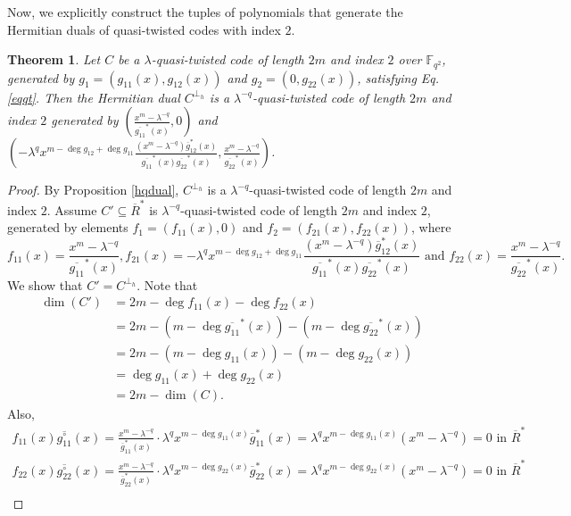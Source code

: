 \documentclass[12 pt]{extarticle}
\numberwithin{equation}{section}
\newtheorem{theorem}{Theorem}[section]
\theoremstyle{definition}
\begin{document}
Now, we explicitly construct the tuples of polynomials that generate the Hermitian duals of quasi-twisted codes with index $2$.
\begin{theorem}\label{thmhdual}
    Let $C$ be a $\lambda$-quasi-twisted code of length $2m$ and index $2$ over $\mathbb{F}_{q^2}$, generated by $g_1=(g_{11}(x),g_{12}(x))$ and $g_2=(0,g_{22}(x))$, satisfying Eq. \ref{eqqt}. Then the Hermitian dual $C^{\perp_h}$ is a $\lambda^{-q}$-quasi-twisted code of length $2m$ and index $2$ generated by $\left (\frac{x^m-\lambda^{-q}}{\overline{g_{11}}^*(x)},0\right )$ and $\left (-\lambda^q x^{m-\deg g_{12}+\deg g_{11}}\frac{(x^m-\lambda^{-q})\overline{g}^*_{12}(x)}{\overline{g_{11}}^*(x)\overline{g_{22}}^*(x)},\frac{x^m-\lambda^{-q}}{\overline{g_{22}}^*(x)}\right )$.
\end{theorem}
\begin{proof}
  By Proposition \ref{hqdual}, $C^{\perp_h}$ is a $\lambda^{-q}$-quasi-twisted code of length $2m$ and index $2$. Assume $C'\subseteq \overline{R}^*$ is $\lambda^{-q}$-quasi-twisted code of length $2m$ and index $2$, generated by elements $f_1=(f_{11}(x),0)$ and $f_2=(f_{21}(x),f_{22}(x))$, where
  $$f_{11}(x)=\frac{x^m-\lambda^{-q}}{\overline{g_{11}}^*(x)}, f_{21}(x)=-\lambda^q x^{m-\deg g_{12}+\deg g_{11}}\frac{(x^m-\lambda^{-q})\overline{g}^*_{12}(x)}{\overline{g_{11}}^*(x)\overline{g_{22}}^*(x)} \text{ and } f_{22}(x)=\frac{x^m-\lambda^{-q}}{\overline{g_{22}}^*(x)}.$$
We show that $C'=C^{\perp_h}$.  Note that
 \begin{equation*}
 \begin{split}
      \dim (C')&=2m-\deg f_{11}(x)-\deg f_{22}(x)\\
      &=2m-(m-\deg \overline{g_{11}}^*(x))-(m-\deg \overline{g_{22}}^*(x))\\
      &= 2m-(m-\deg g_{11}(x))-(m-\deg g_{22}(x))\\
      &=\deg g_{11}(x)+\deg g_{22}(x)\\
      &=2m-\dim (C).
       \end{split}
 \end{equation*}
Also,
\begin{equation*}
    \begin{split}
        f_{11}(x) \overline{g_{11}^{\circ}}(x)=\frac{x^m-\lambda^{-q}}{\overline{g}^*_{11}(x)} \cdot \lambda^q x^{m-\deg g_{11}(x)}\overline{g}^*_{11}(x)=\lambda^q x^{m-\deg g_{11}(x)}(x^m-\lambda^{-q}) =0 \text{ in } \overline{R}^*\\
        f_{22}(x) \overline{g_{22}^{\circ}}(x)=\frac{x^m-\lambda^{-q}}{\overline{g}^*_{22}(x)} \cdot \lambda^q x^{m-\deg g_{22}(x)}\overline{g}^*_{22}(x)=\lambda^q x^{m-\deg g_{22}(x)}(x^m-\lambda^{-q}) =0 \text{ in } \overline{R}^*\\

\end{split}
\end{equation*}
\end{proof}
\end{document}
